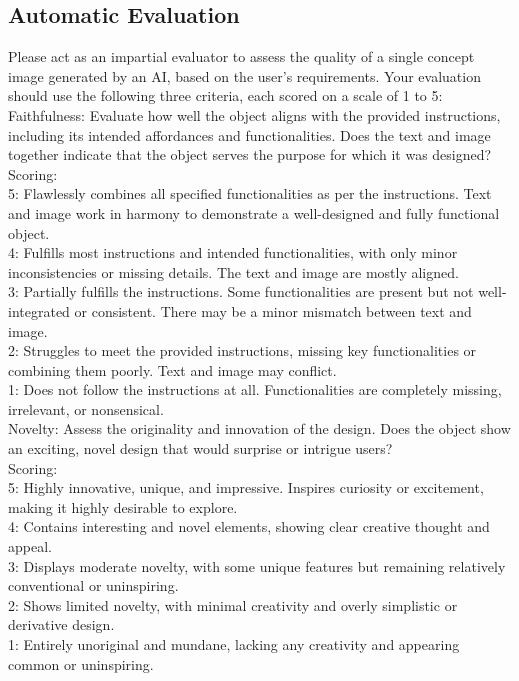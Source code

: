 \subsection{Automatic Evaluation}
\label{appendix:eval_prompt}
\begin{tcolorbox}[colback=gray!10, colframe=black, title=Prompt for Absolute Automatic Evaluation]

Please act as an impartial evaluator to assess the quality of a single concept image generated by an AI, based on the user’s requirements. Your evaluation should use the following three criteria, each scored on a scale of 1 to 5:\\

Faithfulness: Evaluate how well the object aligns with the provided instructions, including its intended affordances and functionalities. Does the text and image together indicate that the object serves the purpose for which it was designed?\\
Scoring:\\
5: Flawlessly combines all specified functionalities as per the instructions. Text and image work in harmony to demonstrate a well-designed and fully functional object.\\
4: Fulfills most instructions and intended functionalities, with only minor inconsistencies or missing details. The text and image are mostly aligned.\\
3: Partially fulfills the instructions. Some functionalities are present but not well-integrated or consistent. There may be a minor mismatch between text and image.\\
2: Struggles to meet the provided instructions, missing key functionalities or combining them poorly. Text and image may conflict.\\
1: Does not follow the instructions at all. Functionalities are completely missing, irrelevant, or nonsensical.\\

Novelty: Assess the originality and innovation of the design. Does the object show an exciting, novel design that would surprise or intrigue users?\\
Scoring:\\
5: Highly innovative, unique, and impressive. Inspires curiosity or excitement, making it highly desirable to explore.\\
4: Contains interesting and novel elements, showing clear creative thought and appeal.\\
3: Displays moderate novelty, with some unique features but remaining relatively conventional or uninspiring.\\
2: Shows limited novelty, with minimal creativity and overly simplistic or derivative design.\\
1: Entirely unoriginal and mundane, lacking any creativity and appearing common or uninspiring.\\


\end{tcolorbox}
